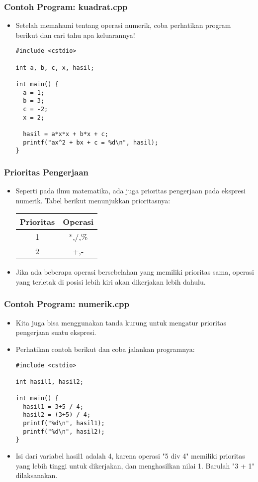 \begin{frame}[fragile]
\frametitle{Contoh Program: kuadrat.cpp}
\begin{itemize}
  \item Setelah memahami tentang operasi numerik, coba perhatikan program berikut dan cari tahu apa keluarannya!
\begin{lstlisting}
#include <cstdio>

int a, b, c, x, hasil;

int main() {
  a = 1;
  b = 3;
  c = -2;
  x = 2;

  hasil = a*x*x + b*x + c;
  printf("ax^2 + bx + c = %d\n", hasil);
}\end{lstlisting}
\end{itemize}
\end{frame}

\begin{frame}
\frametitle{Prioritas Pengerjaan}
\begin{itemize}
  \item Seperti pada ilmu matematika, ada juga prioritas pengerjaan pada ekspresi numerik. Tabel berikut menunjukkan prioritasnya:

  \begin{tabular}{|c|c|}
  \hline Prioritas & Operasi \\
  \hline 1 & *,/,\% \\
  \hline 2 & +,- \\
  \hline
  \end{tabular}
  \item Jika ada beberapa operasi bersebelahan yang memiliki prioritas sama, operasi yang terletak di posisi lebih kiri akan dikerjakan lebih dahulu.
\end{itemize}
\end{frame}

\begin{frame}[fragile]
\frametitle{Contoh Program: numerik.cpp}
\begin{itemize}
  \item Kita juga bisa menggunakan tanda kurung untuk mengatur prioritas pengerjaan suatu ekspresi.
  \item Perhatikan contoh berikut dan coba jalankan programnya:
\begin{lstlisting}
#include <cstdio>

int hasil1, hasil2;

int main() {
  hasil1 = 3+5 / 4;
  hasil2 = (3+5) / 4;
  printf("%d\n", hasil1);
  printf("%d\n", hasil2);
}
\end{lstlisting}
  \item Isi dari variabel hasil1 adalah 4, karena operasi "5 div 4" memiliki prioritas yang lebih tinggi untuk dikerjakan, dan menghasilkan nilai 1. Barulah "3 + 1" dilaksanakan.
\end{itemize}
\end{frame}

